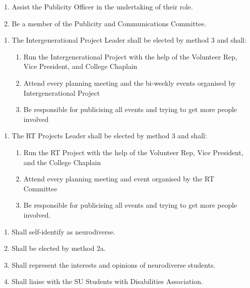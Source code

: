 \begin{enumerate}
    \item Assist the Publicity Officer in the undertaking of their role. 
    \item Be a member of the Publicity and Communications Committee.
\end{enumerate}

\begin{enumerate}
    \item The Intergenerational Project Leader shall be elected by method 3 and shall:
    \begin{enumerate}
        \item Run the Intergenerational Project with the help of the Volunteer Rep, Vice President, and College Chaplain
        \item Attend every planning meeting and the bi-weekly events organised by Intergenerational Project
        \item Be responsible for publicising all events and trying to get more people involved
    \end{enumerate}
\end{enumerate}
    
\begin{enumerate}
    \item The RT Projects Leader shall be elected by method 3 and shall:
    \begin{enumerate}
        \item Run the RT Project with the help of the Volunteer Rep, Vice President, and the College Chaplain
        \item Attend every planning meeting and event organised by the RT Committee 
        \item Be responsible for publicising all events and trying to get more people involved.
    \end{enumerate}
\end{enumerate}

\begin{enumerate}
    \item Shall self-identify as neurodiverse.
    \item Shall be elected by method 2a.
    \item Shall represent the interests and opinions of neurodiverse students. 
    \item Shall liaise with the SU Students with Disabilities Association. 
\end{enumerate}


